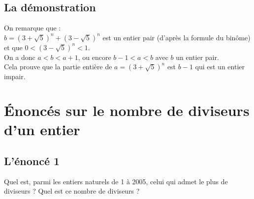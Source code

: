 \documentclass[a4paper,11pt]{book}
\begin{document}
\subsection{La d\'emonstration}
On remarque que :\\
$b=(3+\sqrt 5)^n+(3-\sqrt 5)^n$ est un entier pair (d'apr\`es la formule du
bin\^ome) et que $0<(3-\sqrt 5)^n<1$.\\
On a donc $a<b<a+1$, ou encore $b-1<a<b$ avec $b$ un entier pair.\\
Cela prouve que la partie enti\`ere de $a=(3+\sqrt 5)^n$ est $b-1$
qui est un entier impair.
\section{\'Enonc\'es sur le nombre de diviseurs d'un entier}
\subsection{L'\'enonc\'e 1}
Quel est, parmi les entiers naturels de 1 \`a 2005, celui qui admet le plus
de diviseurs ? Quel est ce nombre de diviseurs ?
\end{document}
